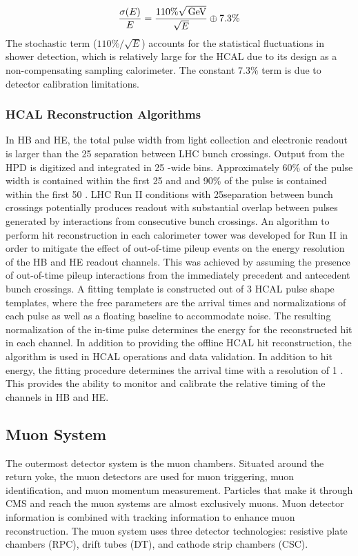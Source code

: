 \begin{equation}
\frac{\sigma(E)}{E}=\frac{110\%\sqrt{\,\text{Ge\hspace{-.08em}V}}}{\sqrt{E}} \oplus 7.3\%
\label{eq:cms:hcal_res}
\end{equation}
The stochastic term (${110\%}/\sqrt{E}$) accounts for the statistical fluctuations in shower detection, which is relatively large for the HCAL due to its design as a non-compensating sampling calorimeter. The constant $7.3\%$ term is due to detector calibration limitations.

\subsubsection{HCAL Reconstruction Algorithms}
In HB and HE, the total pulse width from light collection and electronic readout is larger than the 25 \ns separation between LHC bunch crossings. Output from the HPD is digitized and integrated in 25 \ns-wide bins. Approximately 60\% of the pulse width is contained within the first 25 \ns and and 90\% of the pulse is contained within the first 50 \ns. LHC Run II conditions with 25\ns separation between bunch crossings potentially produces readout with substantial overlap between pulses generated by interactions from consecutive bunch crossings. An algorithm to perform hit reconstruction in each calorimeter tower was developed for Run II in order to mitigate the effect of out-of-time pileup events on the energy resolution of the HB and HE readout channels. This was achieved by assuming the presence of out-of-time pileup interactions from the immediately precedent and antecedent bunch crossings. A fitting template is constructed out of 3 HCAL pulse shape templates, where the free parameters are the arrival times and normalizations of each pulse as well as a floating baseline to accommodate noise. The resulting normalization of the in-time pulse determines the energy for the reconstructed hit in each channel. 
In addition to providing the offline HCAL hit reconstruction, the algorithm is used in HCAL operations and data validation. In addition to hit energy, the fitting procedure determines the arrival time with a resolution of 1 \ns. This provides the ability to monitor and calibrate the relative timing of the channels in HB and HE. 
\subsection{Muon System}\label{ch:cms:muons}
The outermost detector system is the muon chambers. Situated around the return yoke, the muon detectors are used for muon triggering, muon identification, and muon momentum measurement. Particles that make it through CMS and reach the muon systems are almost exclusively muons. Muon detector information is combined with tracking information to enhance muon reconstruction.
The muon system uses three detector technologies: resistive plate chambers (RPC), drift tubes (DT), and cathode strip chambers (CSC)\cite{CMS:1997iti}. 

